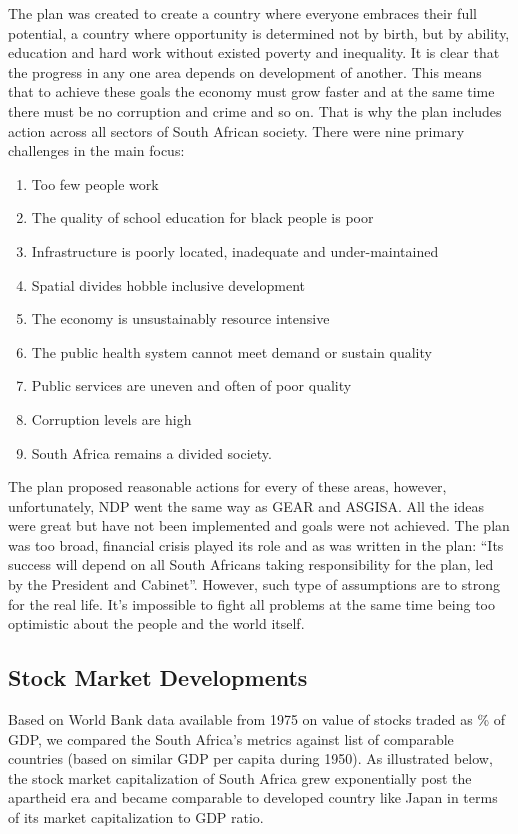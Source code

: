 \documentclass{elsarticle}
\begin{document}
The plan was created to create a country where everyone embraces their full potential, a country where opportunity is determined not by birth, but by ability, education and hard work without existed poverty and inequality. It is clear that the progress in any one area depends on development of another. This means that to achieve these goals the economy must grow faster and at the same time there must be no corruption and crime and so on. That is why the plan includes action across all sectors of South African society. There were nine primary challenges in the main focus:

\begin{enumerate}
	\item Too few people work
	\item The quality of school education for black people is poor
	\item Infrastructure is poorly located, inadequate and under-maintained 
	\item Spatial divides hobble inclusive development
	\item The economy is unsustainably resource intensive
	\item The public health system cannot meet demand or sustain quality
	\item Public services are uneven and often of poor quality
	\item Corruption levels are high
	\item South Africa remains a divided society. 
\end{enumerate}

The plan proposed reasonable actions for every of these areas, however, unfortunately, NDP went the same way as GEAR and ASGISA. All the ideas were great but have not been implemented and goals were not achieved. The plan was too broad, financial crisis played its role and as was written in the plan: ``Its success will depend on all South Africans taking responsibility for the plan, led by the President and Cabinet''.  However, such type of assumptions are to strong for the real life. It's impossible to fight all problems at the same time being too optimistic about the people and the world itself.

\subsection{Stock Market Developments}
Based on World Bank data available from 1975 on value of stocks traded as \% of GDP, we compared the South Africa's metrics against list of comparable countries (based on similar GDP per capita during 1950). As illustrated below, the stock market capitalization of South Africa grew exponentially post the apartheid era and became comparable to developed country like Japan in terms of its market capitalization to GDP ratio.
\end{document}
